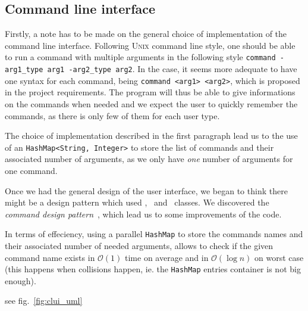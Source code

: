 
\subsection{Command line interface} %
\label{sub:command_line_interface}

Firstly, a note has to be made on the general choice of implementation
of the command line interface.
Following \textsc{Unix} command line style, one should be able to run
a command with multiple arguments in the following
style \lstinline|command -arg1_type arg1 -arg2_type arg2|.
In the \MyFoodora case, it seems more adequate to have one syntax for each
command, being \lstinline|command <arg1> <arg2>|, which is proposed in 
the project requirements. The program will thus be able to give informations
on the commands when needed and we expect the user to quickly remember 
the commands, as there is only few of them for each user type.
 
The choice of implementation described in the first paragraph
lead us to the use of an \lstinline|HashMap<String, Integer>| to
store the list of commands and their associated number of arguments,
as we only have \emph{one} number of arguments for one command.

Once we had the general design of the user interface, we began to
think there might be a design pattern which used \Command, \CommandLine~and
\CommandProcessor~classes.
We discovered the \emph{command design pattern}~\cite{wiki:commandPattern},
which lead us to some improvements of the code.

In terms of effeciency, using a parallel \lstinline|HashMap| to store
the commands names and their associated number of needed arguments,
allows to check if the given command name exists in $\mathcal{O}(1)$
time on average and in $\mathcal{O}(\log{n})$ on worst case
(this happens when collisions happen, ie. the \lstinline|HashMap|
entries container is not big enough)\cite{hashMap}.

see fig.~\ref{fig:clui_uml}

